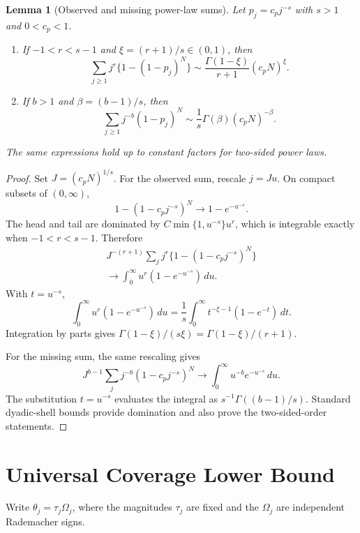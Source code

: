 \documentclass[letterpaper]{article}
\newtheorem{lemma}[theorem]{Lemma}
\newcommand{\1}{\mathbf 1}
\begin{document}
\begin{lemma}[Observed and missing power-law sums]
\label{lem:master-sum}
Let $p_j=c_pj^{-s}$ with $s>1$ and $0<c_p<1$.

\begin{enumerate}
\item If $-1<r<s-1$ and $\xi=(r+1)/s\in(0,1)$, then
\begin{equation}
\sum_{j\ge1}j^r\{1-(1-p_j)^N\}
\sim
\frac{\Gamma(1-\xi)}{r+1}(c_pN)^\xi.
\label{eq:observed-sum}
\end{equation}
\item If $b>1$ and $\beta=(b-1)/s$, then
\begin{equation}
\sum_{j\ge1}j^{-b}(1-p_j)^N
\sim
\frac1s\Gamma(\beta)(c_pN)^{-\beta}.
\label{eq:missing-sum}
\end{equation}
\end{enumerate}
The same expressions hold up to constant factors for two-sided power laws.
\end{lemma}

\begin{proof}
Set $J=(c_pN)^{1/s}$. For the observed sum, rescale $j=Ju$. On compact
subsets of $(0,\infty)$,
\[
1-(1-c_pj^{-s})^N\longrightarrow1-e^{-u^{-s}}.
\]
The head and tail are dominated by
$C\min\{1,u^{-s}\}u^r$, which is integrable exactly when
$-1<r<s-1$. Therefore
\begin{multline*}
J^{-(r+1)}\sum_jj^r\{1-(1-c_pj^{-s})^N\}\\
\longrightarrow
\int_0^\infty u^r(1-e^{-u^{-s}})\,du.
\end{multline*}
With $t=u^{-s}$,
\[
\int_0^\infty u^r(1-e^{-u^{-s}})\,du
=\frac1s\int_0^\infty t^{-\xi-1}(1-e^{-t})\,dt.
\]
Integration by parts gives
$\Gamma(1-\xi)/(s\xi)=\Gamma(1-\xi)/(r+1)$.

For the missing sum, the same rescaling gives
\[
J^{b-1}\sum_jj^{-b}(1-c_pj^{-s})^N
\longrightarrow
\int_0^\infty u^{-b}e^{-u^{-s}}\,du.
\]
The substitution $t=u^{-s}$ evaluates the integral as
$s^{-1}\Gamma((b-1)/s)$. Standard dyadic-shell bounds provide domination and
also prove the two-sided-order statements.
\end{proof}

\section{Universal Coverage Lower Bound}

Write $\theta_j=\tau_j\Omega_j$, where the magnitudes $\tau_j$ are fixed and
the $\Omega_j$ are independent Rademacher signs.
\end{document}
